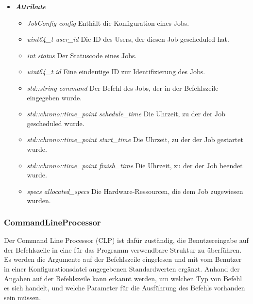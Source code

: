 \documentclass[a4paper,12pt]{article}
\begin{document}
\begin{itemize}[label={}]

	\item \textit{\textbf{Attribute}}
		\begin{itemize}[label={\textbullet}]
			\item \textit{JobConfig config} Enthält die Konfiguration eines Jobs.
			
			\item \textit{uint64\_t user\_id} Die ID des Users, der diesen Job gescheduled hat.
			
			\item \textit{int status} Der Statuscode eines Jobs.
			
			\item \textit{uint64\_t id} Eine eindeutige ID zur Identifizierung des Jobs.
			
			\item \textit{std::string command} Der Befehl des Jobs, der in der Befehlszeile eingegeben wurde.
			
			\item \textit{std::chrono::time\_point schedule\_time} Die Uhrzeit, zu der der Job gescheduled wurde.
			
			\item \textit{std::chrono::time\_point start\_time} Die Uhrzeit, zu der der Job gestartet wurde.
			
			\item \textit{std::chrono::time\_point finish\_time} Die Uhrzeit, zu der der Job beendet wurde.
			
			\item \textit{specs allocated\_specs} Die Hardware-Ressourcen, die dem Job zugewiesen wurden.

		\end{itemize}


\end{itemize}


\subsubsection{CommandLineProcessor}

Der Command Line Processor (CLP) ist dafür zuständig, die Benutzereingabe auf der Befehlszeile in eine für das Programm verwendbare Struktur zu überführen. Es werden die Argumente auf der Befehlszeile eingelesen und mit vom Benutzer in einer Konfigurationsdatei angegebenen Standardwerten ergänzt. Anhand der Angaben auf der Befehlszeile kann erkannt werden, um welchen Typ von Befehl es sich handelt, und welche Parameter für die Ausführung des Befehls vorhanden sein müssen.
\end{document}
